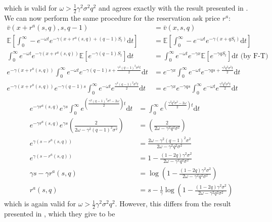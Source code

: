 which is valid for $\omega>\frac{1}{2}\gamma^2\sigma^2q^2$ and agrees exactly with
the result presented in \textcite{AS2008}. We can now perform the same procedure for the
reservation ask price $r^a$:
\begin{align*}
    \bar{v}(x+r^a(s,q),s,q-1)&=\bar{v}(x,s,q)\\
    \mathbb{E}\left[\int_{0}^{\infty}-e^{-\omega t}e^{-\gamma(x+r^a(s,q)+(q-1)S_t)}\mathrm dt\right]&=\mathbb{E}\left[\int_{0}^{\infty}-e^{-\omega t}e^{-\gamma(x+qS_t)}\mathrm dt\right]\\
    \int_{0}^{\infty}e^{-\omega t}e^{-\gamma(x+r^a(s,q))}\mathbb{E}\left[e^{-\gamma(q-1)S_t}\right]\mathrm dt&=\int_{0}^{\infty}e^{-\omega t}e^{-\gamma x}\mathbb{E}\left[e^{-\gamma qS_t}\right]\mathrm dt\textrm{ (by F-T)}\\
    e^{-\gamma(x+r^a(s,q))}\int_{0}^{\infty}e^{-\omega t}e^{-\gamma(q-1)s+\frac{\gamma^2(q-1)^2\sigma^2t}{2}}\mathrm dt&=e^{-\gamma x}\int_{0}^{\infty}e^{-\omega t}e^{-\gamma qs+\frac{\gamma^2q^2\sigma^2t}{2}}\mathrm dt\\
    e^{-\gamma(x+r^a(s,q))}e^{-\gamma(q-1)s}\int_{0}^{\infty}e^{-\omega t}e^{\frac{\gamma^2(q-1)^2\sigma^2t}{2}}\mathrm dt&=e^{-\gamma x}e^{-\gamma qs}\int_{0}^{\infty}e^{-\omega t}e^{\frac{\gamma^2q^2\sigma^2t}{2}}\mathrm dt
\end{align*}
\begin{align*}
    e^{-\gamma r^a(s,q)}e^{\gamma s}\int_{0}^{\infty}e^{\left(\frac{\gamma^2(q-1)^2\sigma^2-2\omega}{2}\right)t}\mathrm dt&=\int_{0}^{\infty}e^{\left(\frac{\gamma^2q^2\sigma^2-2\omega}{2}\right)t}\mathrm dt\\
    e^{-\gamma r^a(s,q)}e^{\gamma s}\left(\frac{2}{2\omega-\gamma^2(q-1)^2\sigma^2}\right)&=\left(\frac{2}{2\omega-\gamma^2q^2\sigma^2}\right)\\
    e^{\gamma(s-r^a(s,q))}&=\frac{2\omega-\gamma^2(q-1)^2\sigma^2}{2\omega-\gamma^2q^2\sigma^2}\\
    e^{\gamma(s-r^a(s,q))}&=1-\frac{(1-2q)\gamma^2\sigma^2}{2\omega-\gamma^2q^2\sigma^2}\\
    \gamma s - \gamma r^a(s,q)&=\log\left(1-\frac{(1-2q)\gamma^2\sigma^2}{2\omega-\gamma^2q^2\sigma^2}\right)\\
    r^a(s,q) &= s-\frac{1}{\gamma}\log\left(1-\frac{(1-2q)\gamma^2\sigma^2}{2\omega-\gamma^2q^2\sigma^2}\right)
\end{align*}
which is again valid for $\omega>\frac{1}{2}\gamma^2\sigma^2q^2$. However, this differs
from the result presented in \textcite{AS2008}, which they give to be
